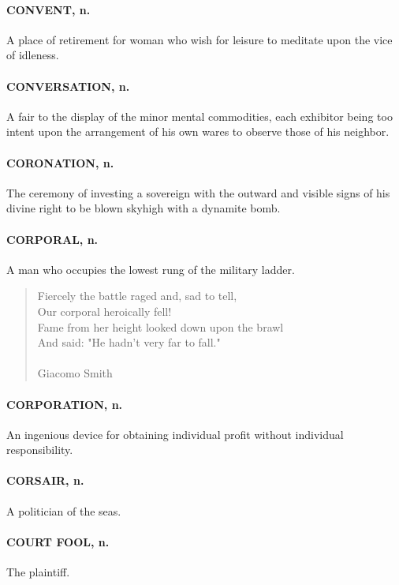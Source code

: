 \documentclass[11pt]{article}
\begin{document}
\paragraph{CONVENT, n.}  A place of retirement for woman who wish for leisure to
meditate upon the vice of idleness.

\paragraph{CONVERSATION, n.}  A fair to the display of the minor mental
commodities, each exhibitor being too intent upon the arrangement of
his own wares to observe those of his neighbor.

\paragraph{CORONATION, n.}  The ceremony of investing a sovereign with the outward
and visible signs of his divine right to be blown skyhigh with a
dynamite bomb.

\paragraph{CORPORAL, n.}  A man who occupies the lowest rung of the military
ladder.

\begin{quote}   Fiercely the battle raged and, sad to tell, \\
  Our corporal heroically fell! \\
  Fame from her height looked down upon the brawl \\
  And said:  "He hadn't very far to fall." \\
 \\
Giacomo Smith \end{quote}


\paragraph{CORPORATION, n.}  An ingenious device for obtaining individual profit
without individual responsibility.

\paragraph{CORSAIR, n.}  A politician of the seas.

\paragraph{COURT FOOL, n.}  The plaintiff.
\end{document}
